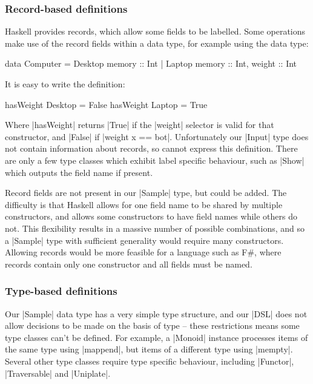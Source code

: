 \documentclass[preprint,draft]{sigplanconf}
\begin{document}
\subsubsection{Record-based definitions}

Haskell provides records, which allow some fields to be labelled. Some operations make use of the record fields within a data type, for example using the data type:

\begin{code}
data Computer  =  Desktop  {memory :: Int}
               |  Laptop   {memory :: Int, weight :: Int}
\end{code}

\noindent It is easy to write the definition:

\begin{code}
hasWeight Desktop{}  = False
hasWeight Laptop{}   = True
\end{code}

Where |hasWeight| returns |True| if the |weight| selector is valid for that constructor, and |False| if |weight x == bot|. Unfortunately our |Input| type does not contain information about records, so cannot express this definition. There are only a few type classes which exhibit label specific behaviour, such as |Show| which outputs the field name if present.

Record fields are not present in our |Sample| type, but could be added. The difficulty is that Haskell allows for one field name to be shared by multiple constructors, and allows some constructors to have field names while others do not. This flexibility results in a massive number of possible combinations, and so a |Sample| type with sufficient generality would require many constructors. Allowing records would be more feasible for a language such as F\#, where records contain only one constructor and all fields must be named.

\subsubsection{Type-based definitions}
\label{sec:fromCtorName}

Our |Sample| data type has a very simple type structure, and our |DSL| does not allow decisions to be made on the basis of type -- these restrictions means some type classes can't be defined. For example, a |Monoid| instance processes items of the same type using |mappend|, but items of a different type using |mempty|. Several other type classes require type specific behaviour, including |Functor|, |Traversable| and |Uniplate|.
\end{document}
